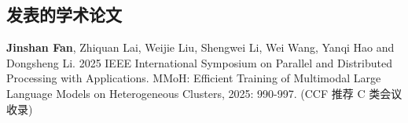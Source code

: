 \begin{resume}
	
  
  \section*{发表的学术论文} %

  \begin{enumerate}[label={[\arabic*]},itemsep=0pt,parsep=0pt,labelindent=26pt,labelwidth=*,leftmargin=0pt,itemindent=*,align=left]
   
  \item \textbf{Jinshan Fan}, Zhiquan Lai, Weijie Liu, Shengwei Li, Wei Wang, Yanqi Hao and Dongsheng Li. 2025 IEEE International Symposium on Parallel and Distributed Processing with Applications. MMoH: Efficient Training of Multimodal Large Language Models on Heterogeneous Clusters, 2025: 990-997. (CCF 推荐 C 类会议收录)
  \end{enumerate}
\end{resume}
